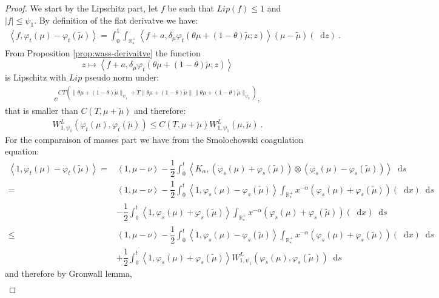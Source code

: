 \documentclass[11pt,a4paper]{article}
\newcommand{\RRP}{\mathbb{R}^+_*}
\newcommand{\brac}[1]{\left\langle#1\right\rangle}
\newcommand{\dd}{\mathop{}\!\mathrm{d}}
\begin{document}
\begin{proof}
    We start by the Lipschitz part, let $f $ be such that $Lip(f) \leq 1$ and $|f| \leq \psi_1$. By definition of the flat derivatve we have:
    \begin{align*}
        \brac{f,\varphi_t(\mu)-\varphi_t(\tilde{\mu})} = \int_0^1 \int_{\RRP} \brac{f + a, \delta_\mu\varphi_t(\theta\mu + (1-\theta)\tilde{\mu};z)} \left(\mu-\tilde{\mu}\right)(\dd z)\ .
    \end{align*}
    From Proposition \ref{prop:wass-derivaitve} the function 
    \[z \mapsto \brac{f+a, \delta_\mu\varphi_t(\theta\mu + (1-\theta)\tilde{\mu};z)}\]
    is Lipschitz with $Lip$ pseudo norm under:
    \begin{align*}
        e^{CT(\|\theta\mu + (1-\theta)\tilde{\mu}\|_{\psi_1} +  T\|\theta\mu + (1-\theta)\tilde{\mu}\|\|\theta\mu + (1-\theta)\tilde{\mu}\|_{\psi_2})},
    \end{align*}
    that is smaller than $C(T,\mu + \tilde{\mu})$ and therefore:
    \begin{align*}
        W_{1,\psi_1}^L(\varphi_t(\mu),\varphi_t(\tilde{\mu})) \leq C(T,\mu + \tilde{\mu})W_{1,\psi_1}^L(\mu,\tilde{\mu})\ .
    \end{align*}
    For the comparaison of masses part we have from the Smolochowski coagulation equation:
    \begin{align*}
        \brac{1,\varphi_t(\mu)-\varphi_t(\tilde{\mu})} =& \brac{1,\mu-\nu} - \dfrac12\int_0^t \brac{K_\alpha ,\left( \varphi_s(\mu)+\varphi_s(\tilde{\mu})\right)\otimes\left(\varphi_s(\mu)-\varphi_s(\tilde{\mu})\right)}\dd s \\
        =& \brac{1,\mu-\nu} - \dfrac12\int_0^t \brac{1,\varphi_s(\mu)-\varphi_s(\tilde{\mu})}\int_{\RRP} x^{-\alpha} \left(\varphi_s(\mu)+\varphi_s(\tilde{\mu})\right)(\dd x) \dd s \\
        &- \dfrac12\int_0^t \brac{1,\varphi_s(\mu)+\varphi_s(\tilde{\mu})} \int_{\RRP} x^{-\alpha} \left(\varphi_s(\mu)+\varphi_s(\tilde{\mu})\right)(\dd x) \dd s\\
        \leq& \brac{1,\mu-\nu} - \dfrac12\int_0^t \brac{1,\varphi_s(\mu)-\varphi_s(\tilde{\mu})}\int_{\RRP} x^{-\alpha} \left(\varphi_s(\mu) + \varphi_s(\tilde{\mu})\right)(\dd x) \dd s\\
        &+ \dfrac12\int_0^t \brac{1,\varphi_s(\mu)+\varphi_s(\tilde{\mu})} W_{1,\psi_1}^L\left(\varphi_s(\mu),\varphi_s(\tilde{\mu})\right) \dd s
    \end{align*}
    and therefore by Gronwall lemma,
    \begin{multline*}

\end{multline*}
\end{proof}
\end{document}
